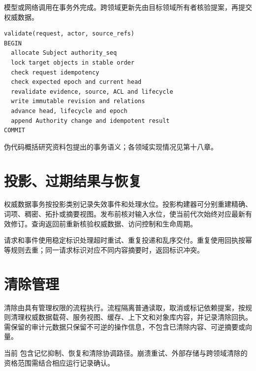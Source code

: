 模型或网络调用在事务外完成。跨领域更新先由目标领域所有者核验提案，再提交权威数据。\cite{nous-research-package}

\begin{lstlisting}[caption={目标变更合同的简化顺序},label={lst:mutation-order}]
validate(request, actor, source_refs)
BEGIN
  allocate Subject authority_seq
  lock target objects in stable order
  check request idempotency
  check expected epoch and current head
  revalidate evidence, source, ACL and lifecycle
  write immutable revision and relations
  advance head, lifecycle and epoch
  append Authority change and idempotent result
COMMIT
\end{lstlisting}

伪代码概括研究资料包提出的事务语义；各领域实现情况见第十八章。

\section{投影、过期结果与恢复}

权威数据事务按投影类别记录失效事件和处理水位。投影构建器可分别重建精确、词项、稠密、拓扑或摘要视图。发布前核对输入水位，使当前代次始终对应最新有效修订。查询返回前重新核验权威数据、访问控制和生命周期。\cite{nous-research-package,nous-code-snapshot}

请求和事件使用稳定标识处理超时重试、重复投递和乱序交付。重复使用回执按幂等规则去重；同一请求标识对应不同内容摘要时，返回标识冲突。

\section{清除管理}

清除由具有管理权限的流程执行。流程隔离普通读取，取消或标记依赖提案，按规则清理权威数据载荷、服务视图、缓存、上下文和对象库内容，并记录清除回执。需保留的审计元数据只保留不可逆的操作信息，不包含已清除内容、可逆摘要或向量。\cite{nous-research-package}

当前  包含记忆抑制、恢复和清除协调路径。崩溃重试、外部存储与跨领域清除的资格范围需结合相应运行记录确认。\cite{nous-code-snapshot}

